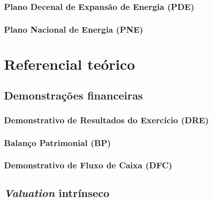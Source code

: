 \documentclass[grad,numbers]{coppe}
\begin{document}
  \hypertarget{plano-decenal-de-expansuxe3o-de-energia-pde}{%
  \subsection{Plano Decenal de Expansão de Energia (PDE)}\label{plano-decenal-de-expansuxe3o-de-energia-pde}}
  
  \hypertarget{plano-nacional-de-energia-pne}{%
  \subsection{Plano Nacional de Energia (PNE)}\label{plano-nacional-de-energia-pne}}
  
  \hypertarget{referencial-teuxf3rico}{%
  \chapter{Referencial teórico}\label{referencial-teuxf3rico}}
  
  \hypertarget{demonstrauxe7uxf5es-financeiras}{%
  \section{Demonstrações financeiras}\label{demonstrauxe7uxf5es-financeiras}}
  
  \hypertarget{demonstrativo-de-resultados-do-exercuxedcio-dre}{%
  \subsection{Demonstrativo de Resultados do Exercício (DRE)}\label{demonstrativo-de-resultados-do-exercuxedcio-dre}}
  
  \hypertarget{balanuxe7o-patrimonial-bp}{%
  \subsection{Balanço Patrimonial (BP)}\label{balanuxe7o-patrimonial-bp}}
  
  \hypertarget{demonstrativo-de-fluxo-de-caixa-dfc}{%
  \subsection{Demonstrativo de Fluxo de Caixa (DFC)}\label{demonstrativo-de-fluxo-de-caixa-dfc}}
  
  \hypertarget{valuation-intruxednseco}{%
  \section{\texorpdfstring{\emph{Valuation} intrínseco}{Valuation intrínseco}}\label{valuation-intruxednseco}}
  
\end{document}
